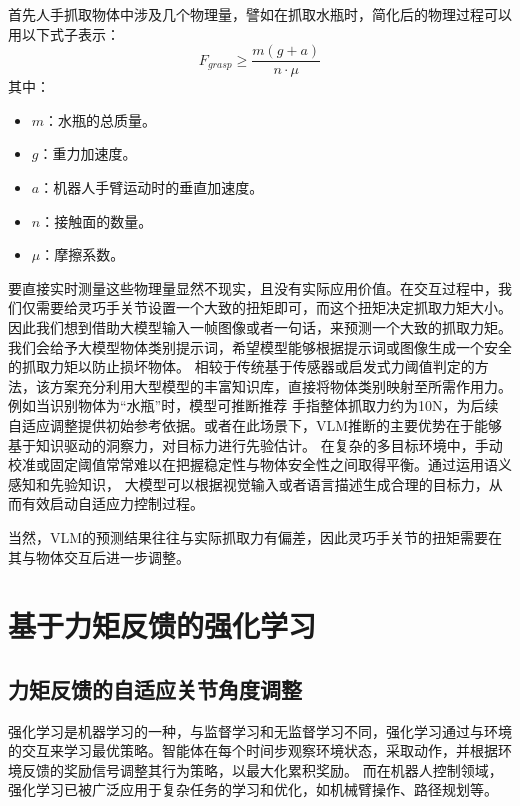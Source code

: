 首先人手抓取物体中涉及几个物理量，譬如在抓取水瓶时，简化后的物理过程可以用以下式子表示：
\begin{equation}
    F_{grasp} \geq \frac{m(g + a)}{n \cdot \mu}
\end{equation}
其中：
\begin{itemize}
    \item $ m $：水瓶的总质量。
    \item $ g $：重力加速度。
    \item $ a $：机器人手臂运动时的垂直加速度。
    \item $ n $：接触面的数量。
    \item $ \mu $：摩擦系数。
\end{itemize}
要直接实时测量这些物理量显然不现实，且没有实际应用价值。在交互过程中，我们仅需要给灵巧手关节设置一个大致的扭矩即可，而这个扭矩决定抓取力矩大小。
因此我们想到借助大模型输入一帧图像或者一句话，来预测一个大致的抓取力矩。我们会给予大模型物体类别提示词，希望模型能够根据提示词或图像生成一个安全的抓取力矩以防止损坏物体。
相较于传统基于传感器或启发式力阈值判定的方法，该方案充分利用大型模型的丰富知识库，直接将物体类别映射至所需作用力。例如当识别物体为“水瓶”时，模型可推断推荐
手指整体抓取力约为10N，为后续自适应调整提供初始参考依据。或者在此场景下，VLM推断的主要优势在于能够基于知识驱动的洞察力，对目标力进行先验估计。
在复杂的多目标环境中，手动校准或固定阈值常常难以在把握稳定性与物体安全性之间取得平衡。通过运用语义感知和先验知识， 大模型可以根据视觉输入或者语言描述生成合理的目标力，从而有效启动自适应力控制过程。

当然，VLM的预测结果往往与实际抓取力有偏差，因此灵巧手关节的扭矩需要在其与物体交互后进一步调整。

\section{基于力矩反馈的强化学习}
\subsection{力矩反馈的自适应关节角度调整}
强化学习是机器学习的一种，与监督学习和无监督学习不同，强化学习通过与环境的交互来学习最优策略。智能体在每个时间步观察环境状态，采取动作，并根据环境反馈的奖励信号调整其行为策略，以最大化累积奖励。
而在机器人控制领域，强化学习已被广泛应用于复杂任务的学习和优化，如机械臂操作、路径规划等。

